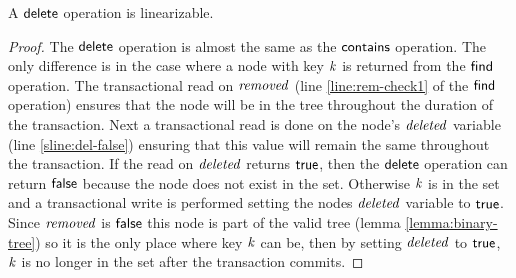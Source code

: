\begin{theorem}
\label{theorem:delete-valid}
A $\act{delete}$ operation is linearizable.
\end{theorem}
\begin{proof}
The $\act{delete}$ operation is almost the same as the $\act{contains}$ operation.
The only difference is in the case where a node with key $\ms{k}$ is returned from the $\act{find}$ operation.
The transactional read on $\ms{removed}$ (line \ref{line:rem-check1} of the $\act{find}$ operation) ensures that the node will be in the tree throughout the duration of the transaction.
Next a transactional read is done on the node's $\ms{deleted}$ variable (line \ref{sline:del-false}) ensuring that this value will remain the same throughout the transaction.
If the read on $\ms{deleted}$ returns $\lit{true}$, then the $\act{delete}$ operation can return $\lit{false}$ because the node does not exist in the set.
Otherwise $\ms{k}$ is in the set and a transactional write is performed setting the nodes $\ms{deleted}$ variable to $\lit{true}$.
Since $\ms{removed}$ is $\lit{false}$ this node is part of the valid tree (lemma \ref{lemma:binary-tree}) so it is the only place where key $\ms{k}$ can be, then by setting
$\ms{deleted}$ to $\lit{true}$, $\ms{k}$ is no longer in the set after the transaction commits.
\end{proof}




















